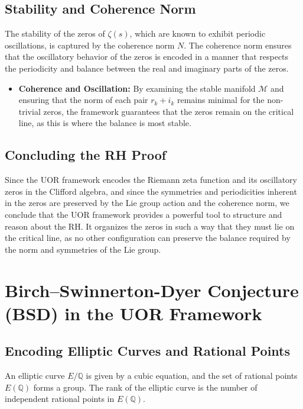 \documentclass[11pt]{article}
\begin{document}
\subsection{Stability and Coherence Norm}

The stability of the zeros of \(\zeta(s)\), which are known to exhibit periodic oscillations, is captured by the coherence norm \(N\). The coherence norm ensures that the oscillatory behavior of the zeros is encoded in a manner that respects the periodicity and balance between the real and imaginary parts of the zeros.

\begin{itemize}
    \item \textbf{Coherence and Oscillation:} By examining the stable manifold \(\mathcal{M}\) and ensuring that the norm of each pair \(r_k + i_k\) remains minimal for the non-trivial zeros, the framework guarantees that the zeros remain on the critical line, as this is where the balance is most stable.
\end{itemize}

\subsection{Concluding the RH Proof}

Since the UOR framework encodes the Riemann zeta function and its oscillatory zeros in the Clifford algebra, and since the symmetries and periodicities inherent in the zeros are preserved by the Lie group action and the coherence norm, we conclude that the UOR framework provides a powerful tool to structure and reason about the RH. It organizes the zeros in such a way that they must lie on the critical line, as no other configuration can preserve the balance required by the norm and symmetries of the Lie group.

\section{Birch–Swinnerton-Dyer Conjecture (BSD) in the UOR Framework}

\subsection{Encoding Elliptic Curves and Rational Points}

An elliptic curve \(E/\mathbb{Q}\) is given by a cubic equation, and the set of rational points \(E(\mathbb{Q})\) forms a group. The rank of the elliptic curve is the number of independent rational points in \(E(\mathbb{Q})\).
\end{document}
